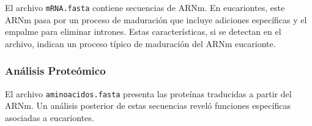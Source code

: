 El archivo \texttt{mRNA.fasta} contiene secuencias de ARNm. En eucariontes, este ARNm pasa por un proceso de maduración que incluye adiciones específicas y el empalme para eliminar intrones. Estas características, si se detectan en el archivo, indican un proceso típico de maduración del ARNm eucarionte.

\subsubsection*{Análisis Proteómico}

El archivo \texttt{aminoacidos.fasta} presenta las proteínas traducidas a partir del ARNm. Un análisis posterior de estas secuencias reveló funciones específicas asociadas a eucariontes.
